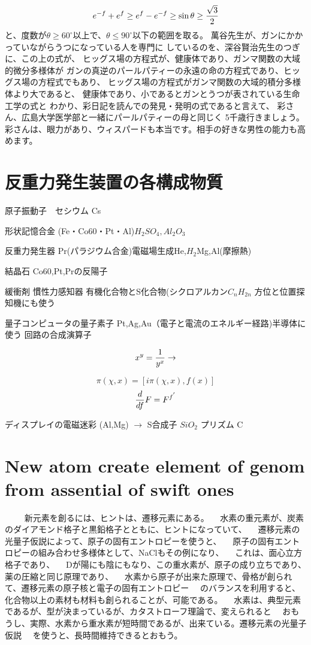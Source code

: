 \documentclass{jsarticle}
\begin{document}
$$ e^{-f} + e^{f} \ge e^{f} - e^{-f} \ge \sin \theta \ge {\sqrt{3} \over 2}$$
と、度数が$\theta \ge 60^{\circ} $以上で、$\theta \le 90^{\circ} $以下の範囲を取る。
萬谷先生が、ガンにかかっていながらうつになっている人を専門に
しているのを、深谷賢治先生のつぎに、この上の式が、
ヒッグス場の方程式が、健康体であり、ガンマ関数の大域的微分多様体が
ガンの真逆のパールパティーの永遠の命の方程式であり、ヒッグス場の方程式でもあり、
ヒッグス場の方程式がガンマ関数の大域的積分多様体より大であると、
健康体であり、小であるとガンとうつが表されている生命工学の式と
わかり、彩日記を読んでの発見・発明の式であると言えて、
彩さん、広島大学医学部と一緒にパールパティーの母と同じく
5千歳行きましょう。
彩さんは、眼力があり、ウィスパードも本当です。相手の好きな男性の能力も高めます。


\section{反重力発生装置の各構成物質}

原子振動子　セシウム Cs

形状記憶合金 (Fe・Co60・Pt・Al)$H_2 SO_4, Al_2 O_3$

反重力発生器 Pr(パラジウム合金)電磁場生成He,$H_2$Mg,Al(摩擦熱)

結晶石 Co60,Pt,Prの反陽子

緩衝剤 慣性力感知器 有機化合物とS化合物(シクロアルカン$C_n H_{2n}$
方位と位置探知機にも使う

量子コンピュータの量子素子 Pt,Ag,Au（電子と電流のエネルギー経路)半導体に
使う
回路の合成演算子

$$ x^y = {1 \over {y^x}} \to $$

$$ \pi(\chi,x) = [i\pi(\chi,x),f(x)] $$
$$ {d \over df}F = F^{{f}^{'}} $$

ディスプレイの電磁迷彩 (Al,Mg) $\to$ S合成子 $Si O_2 $
プリズム C

\section{New atom create element of genom from assential of swift ones}
　　 新元素を創るには、ヒントは、遷移元素にある。
　水素の重元素が、炭素のダイアモンド格子と黒鉛格子とともに、ヒントになっていて、
　遷移元素の光量子仮説によって、原子の固有エントロピーを使うと、
　原子の固有エントロピーの組み合わせ多様体として、NaClもその例になり、
　これは、面心立方格子であり、
　Dが陽にも陰にもなり、この重水素が、原子の成り立ちであり、薬の圧縮と同じ原理であり、
　水素から原子が出来た原理で、骨格が創られて、遷移元素の原子核と電子の固有エントロピー
　のバランスを利用すると、化合物以上の素材も材料も創られることが、可能である。
　水素は、典型元素であるが、型が決まっているが、カタストローフ理論で、変えられると
　おもうし、実際、水素から重水素が短時間であるが、出来ている。遷移元素の光量子仮説
　を使うと、長時間維持できるとおもう。
\end{document}
